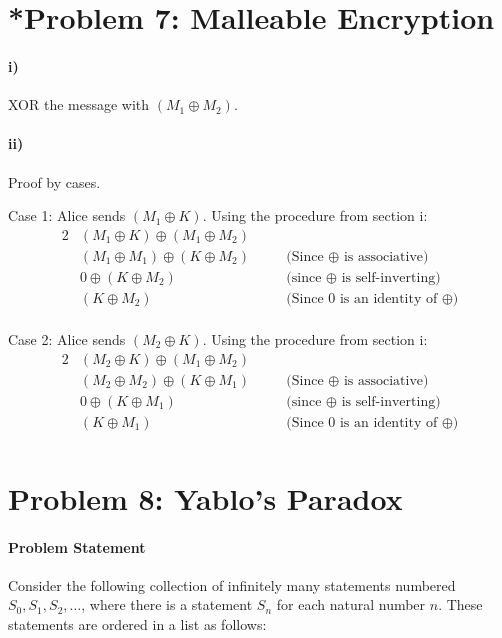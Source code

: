 \documentclass[10pt,letter]{article}
\begin{document}
\section*{*Problem 7: Malleable Encryption}
\paragraph{i)} XOR the message with $(M_1 \oplus M_2)$. 
\paragraph{ii)} Proof by cases.

Case 1: Alice sends $(M_1 \oplus K)$. Using the procedure from section i:
\begin{alignat*}{2}
  &(M_1 \oplus K) \oplus (M_1 \oplus M_2) \\
  &(M_1 \oplus M_1) \oplus (K \oplus M_2) &\quad &\text{(Since $\oplus$ is associative)}\\
  &0 \oplus (K \oplus M_2) &\quad &\text{(since $\oplus$ is self-inverting)}\\  
  &(K \oplus M_2) &\quad &\text{(Since 0 is an identity of $\oplus$)}\\
\end{alignat*}

Case 2: Alice sends $(M_2 \oplus K)$. Using the procedure from section i:
\begin{alignat*}{2}
  &(M_2 \oplus K) \oplus (M_1 \oplus M_2) \\
  &(M_2 \oplus M_2) \oplus (K \oplus M_1) &\quad &\text{(Since $\oplus$ is associative)}\\
  &0 \oplus (K \oplus M_1) &\quad &\text{(since $\oplus$ is self-inverting)}\\  
  &(K \oplus M_1) &\quad &\text{(Since 0 is an identity of $\oplus$)}\\
\end{alignat*}

\section*{Problem 8: Yablo's Paradox}
\paragraph{Problem Statement}
Consider the following collection of infinitely many statements numbered $S_0, S_1, S_2, \ldots$, where there is a statement $S_n$ for each natural number $n$. These statements are ordered in a list as follows:
\end{document}
